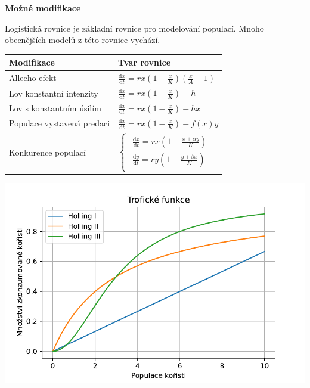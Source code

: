 \documentclass[handouts]{beamer}
\def\subsection#1{\par {\bfseries #1}\par\smallskip}
\begin{document}
\begin{frame}
\subsection{Možné modifikace}

Logistická rovnice je základní rovnice pro modelování populací. Mnoho obecnějších modelů z této rovnice vychází.

\begin{minipage}[t]{0.45\linewidth}
  \vspace*{0pt}
\everymath{\displaystyle}
\begin{tabular}{ll}
  \toprule
  Modifikace&Tvar rovnice\\
  \midrule
Alleeho efekt & $\frac{\mathrm dx}{\mathrm dt}=rx\left(1-\frac xK\right)\left(\frac
xA-1\right)$\\[5mm]
Lov konstantní intenzity & $\frac{\mathrm dx}{\mathrm dt}=rx\left(1-\frac xK\right)-h$\\[5mm]
Lov s konstantním úsilím & $\frac{\mathrm dx}{\mathrm dt}=rx\left(1-\frac xK\right)-hx$\\[5mm]
Populace vystavená predaci & $\frac{\mathrm dx}{\mathrm dt}=rx\left(1-\frac xK\right)-f(x)y$\\[5mm]
  Konkurence populací & $\begin{cases}
                        \begin{aligned}
           \frac{\mathrm dx}{\mathrm dt}=rx\left(1-\frac {x+\alpha y}K\right)\\
           \frac{\mathrm dy}{\mathrm dt}=ry\left(1-\frac {y+\beta x}K\right)
                        \end{aligned}
\end{cases}
$\\
  \bottomrule
\end{tabular}

\end{minipage}\hfill
\begin{minipage}[t]{0.45\linewidth}
  \vspace*{0pt}

  \includegraphics[width=\linewidth]{holling.pdf}


\end{minipage}
\end{frame}
\end{document}
